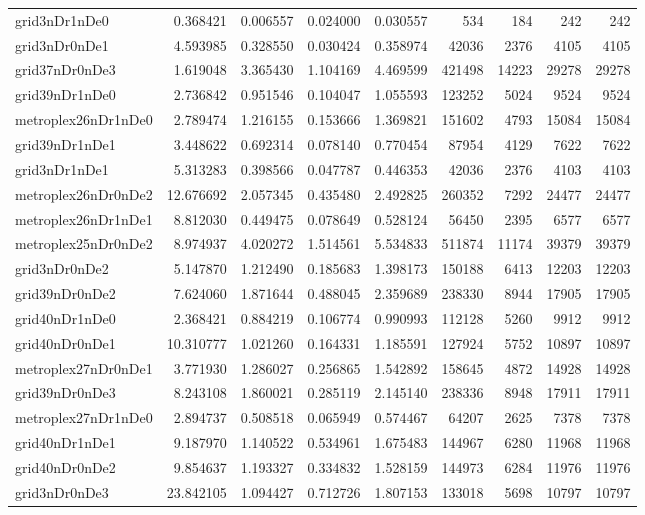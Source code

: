 \documentclass[../../../thesis.tex]{subfiles}
\begin{document}
\begin{longtable}{|l|r|r|r|r|r|r|r|r|}
grid3nDr1nDe0 & 0.368421 & 0.006557 & 0.024000 & 0.030557 & 534 & 184 & 242 & 242 \\
grid3nDr0nDe1 & 4.593985 & 0.328550 & 0.030424 & 0.358974 & 42036 & 2376 & 4105 & 4105 \\
grid37nDr0nDe3 & 1.619048 & 3.365430 & 1.104169 & 4.469599 & 421498 & 14223 & 29278 & 29278 \\
grid39nDr1nDe0 & 2.736842 & 0.951546 & 0.104047 & 1.055593 & 123252 & 5024 & 9524 & 9524 \\
metroplex26nDr1nDe0 & 2.789474 & 1.216155 & 0.153666 & 1.369821 & 151602 & 4793 & 15084 & 15084 \\
grid39nDr1nDe1 & 3.448622 & 0.692314 & 0.078140 & 0.770454 & 87954 & 4129 & 7622 & 7622 \\
grid3nDr1nDe1 & 5.313283 & 0.398566 & 0.047787 & 0.446353 & 42036 & 2376 & 4103 & 4103 \\
metroplex26nDr0nDe2 & 12.676692 & 2.057345 & 0.435480 & 2.492825 & 260352 & 7292 & 24477 & 24477 \\
metroplex26nDr1nDe1 & 8.812030 & 0.449475 & 0.078649 & 0.528124 & 56450 & 2395 & 6577 & 6577 \\
metroplex25nDr0nDe2 & 8.974937 & 4.020272 & 1.514561 & 5.534833 & 511874 & 11174 & 39379 & 39379 \\
grid3nDr0nDe2 & 5.147870 & 1.212490 & 0.185683 & 1.398173 & 150188 & 6413 & 12203 & 12203 \\
grid39nDr0nDe2 & 7.624060 & 1.871644 & 0.488045 & 2.359689 & 238330 & 8944 & 17905 & 17905 \\
grid40nDr1nDe0 & 2.368421 & 0.884219 & 0.106774 & 0.990993 & 112128 & 5260 & 9912 & 9912 \\
grid40nDr0nDe1 & 10.310777 & 1.021260 & 0.164331 & 1.185591 & 127924 & 5752 & 10897 & 10897 \\
metroplex27nDr0nDe1 & 3.771930 & 1.286027 & 0.256865 & 1.542892 & 158645 & 4872 & 14928 & 14928 \\
grid39nDr0nDe3 & 8.243108 & 1.860021 & 0.285119 & 2.145140 & 238336 & 8948 & 17911 & 17911 \\
metroplex27nDr1nDe0 & 2.894737 & 0.508518 & 0.065949 & 0.574467 & 64207 & 2625 & 7378 & 7378 \\
grid40nDr1nDe1 & 9.187970 & 1.140522 & 0.534961 & 1.675483 & 144967 & 6280 & 11968 & 11968 \\
grid40nDr0nDe2 & 9.854637 & 1.193327 & 0.334832 & 1.528159 & 144973 & 6284 & 11976 & 11976 \\
grid3nDr0nDe3 & 23.842105 & 1.094427 & 0.712726 & 1.807153 & 133018 & 5698 & 10797 & 10797 \\

\end{longtable}
\end{document}
